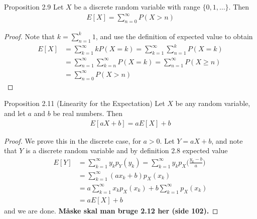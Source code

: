 \begin{boks}{Proposition 2.9}
Let $X$ be a discrete random variable with range $\{0,1,\ldots\}$. Then
\begin{align*}
    E[X] = \sum_{n=0}^\infty P(X > n)
\end{align*}
\end{boks}

\begin{proof}
Note that $k= \sum_{n=1}^k 1$, and use the definition of expected value to obtain
\begin{align*}
    E[X] &= \sum_{k=1}^\infty kP(X = k) = \sum_{k=1}^\infty \sum_{n=1}^k P(X = k) \\
    &= \sum_{n=1}^\infty \sum_{k=n}^\infty P(X = k) = \sum_{n=1}^\infty P(X \geq n)\\
    &= \sum_{n=0}^\infty P(X > n)
\end{align*}
\end{proof}

\begin{boks}{Proposition 2.11 (Linearity for the Expectation)}
Let $X$ be any random variable, and let $a$ and $b$ be real numbers. Then
\begin{align*}
    E[aX + b] = aE[X] + b
\end{align*}
\end{boks}

\begin{proof}
We prove this in the discrete case, for $a > 0$. Let $Y = aX + b$, and note that $Y$ is a discrete random variable and by definition 2.8 expected value
\begin{align*}
    E[Y] &= \sum_{k=1}^\infty y_kp_Y(y_k) = \sum_{k=1}^\infty y_kp_X\bigg(\frac{y_k - b}{a}\bigg)\\
    &= \sum_{k=1}^\infty (ax_k + b) p_X(x_k) \\
    &= a\sum_{k=1}^\infty x_kp_X(x_k) + b \sum_{k=1}^\infty p_X(x_k)\\
    &= aE[X] + b
\end{align*}
and we are done. \textbf{Måske skal man bruge 2.12 her (side 102).}
\end{proof}
